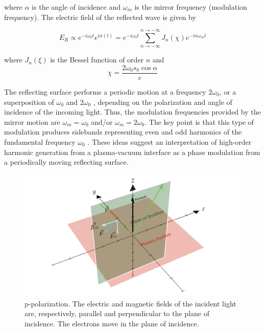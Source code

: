 \documentclass[12pt]{article}
\newcounter{subsubsubsection}[subsubsection]
\begin{document}
where $\alpha$ is the angle of incidence and $\omega_m$ is the mirror frequency (modulation frequency). The electric field of the reflected wave is given by

\begin{equation}
    E_R \propto e^{-i\omega_0 t}e^{i\phi(t)} =  e^{-i\omega_0 t} \sum _{n \to -\infty}^{n \to -\infty}J_n(\chi) e^{-in\omega_m t}
\end{equation}

where $J_n(\xi)$ is the Bessel function of order $n$ and
\begin{equation}
    \label{eq:chi-def}
    \chi = \frac{2\omega_0s_0\cos\alpha}{c}
\end{equation}


The reflecting surface performs a periodic motion at a frequency $2\omega_0$, or a superposition of $\omega_0$ and $2\omega_0$ , depending on the polarization and angle of incidence of the incoming light. Thus, the modulation frequencies provided by the mirror motion are $\omega_m = \omega_0$ and/or $\omega_m = 2\omega_0$. The key point is that this type of modulation produces sidebands representing even and odd harmonics of the fundamental frequency $\omega_0$ . These ideas suggest an interpretation of high-order harmonic generation from a plasma-vacuum interface as a phase modulation from a periodically moving reflecting surface.

\begin{figure}[h]
    \centering
    \includegraphics[width=1\textwidth]{images/p.png}
    \caption{p-polarization. The electric and magnetic fields of the incident light are, respectively, parallel and perpendicular to the plane of incidence. The electrons move in the plane of incidence.}
    \label{fig:p-polarized}
\end{figure}
\end{document}
